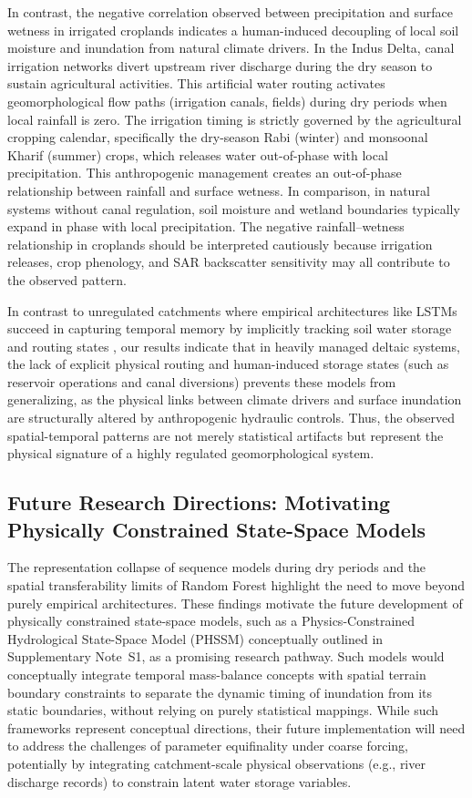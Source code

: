 \documentclass[12pt, a4paper]{article}
\begin{document}
In contrast, the negative correlation observed between precipitation and surface wetness in irrigated croplands indicates a human-induced decoupling of local soil moisture and inundation from natural climate drivers. In the Indus Delta, canal irrigation networks divert upstream river discharge during the dry season to sustain agricultural activities. This artificial water routing activates geomorphological flow paths (irrigation canals, fields) during dry periods when local rainfall is zero. The irrigation timing is strictly governed by the agricultural cropping calendar, specifically the dry-season Rabi (winter) and monsoonal Kharif (summer) crops, which releases water out-of-phase with local precipitation. This anthropogenic management creates an out-of-phase relationship between rainfall and surface wetness. In comparison, in natural systems without canal regulation, soil moisture and wetland boundaries typically expand in phase with local precipitation. The negative rainfall–wetness relationship in croplands should be interpreted cautiously because irrigation releases, crop phenology, and SAR backscatter sensitivity may all contribute to the observed pattern.

In contrast to unregulated catchments where empirical architectures like LSTMs succeed in capturing temporal memory by implicitly tracking soil water storage and routing states \citep{Kratzert2018, Nearing2020What}, our results indicate that in heavily managed deltaic systems, the lack of explicit physical routing and human-induced storage states (such as reservoir operations and canal diversions) prevents these models from generalizing, as the physical links between climate drivers and surface inundation are structurally altered by anthropogenic hydraulic controls. Thus, the observed spatial-temporal patterns are not merely statistical artifacts but represent the physical signature of a highly regulated geomorphological system.

\subsection{Future Research Directions: Motivating Physically Constrained State-Space Models}
The representation collapse of sequence models during dry periods and the spatial transferability limits of Random Forest highlight the need to move beyond purely empirical architectures. These findings motivate the future development of physically constrained state-space models, such as a Physics-Constrained Hydrological State-Space Model (PHSSM) conceptually outlined in Supplementary Note~S1, as a promising research pathway. Such models would conceptually integrate temporal mass-balance concepts with spatial terrain boundary constraints to separate the dynamic timing of inundation from its static boundaries, without relying on purely statistical mappings. While such frameworks represent conceptual directions, their future implementation will need to address the challenges of parameter equifinality under coarse forcing, potentially by integrating catchment-scale physical observations (e.g., river discharge records) to constrain latent water storage variables.
\end{document}

